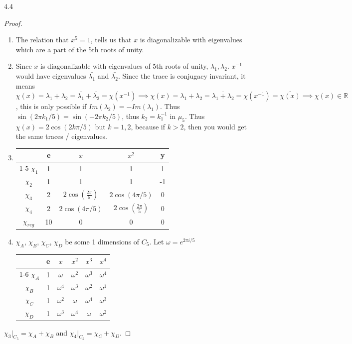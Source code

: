 \documentclass{article}
\newcommand{\R}{\mathbb{R}}
\begin{document}
\begin{PROB}{4.4}\label{Problem 4.4.}
    
\end{PROB}
\begin{proof}
    \begin{enumerate}
        \item The relation that $x^5 = 1$, tells us that $x$ is diagonalizable with eigenvalues which are a part of the 5th roots of unity. 
        \item Since $x$ is diagonalizable with eigenvalues of 5th roots of unity, $\lambda_1, \lambda_2$. $x^{-1}$ would have eigenvalues $\bar{\lambda_1}$ and $\bar{\lambda_2}$. Since the trace is conjugacy invariant, it means $\chi(x) = \lambda_1 + \lambda_2 = \bar{\lambda_1} +\bar{\lambda_2} = \chi(x^{-1}) \implies \chi(x) = \lambda_1 + \lambda_2 = \overline{\lambda_1 + \lambda_2} = \chi(x^{-1}) = \overline{\chi(x)} \implies \chi(x) \in \R$, this is only possible if $Im(\lambda_2) = - Im(\lambda_1)$. Thus $\sin(2 \pi k_1 / 5) = \sin( - 2 \pi k_2 / 5)$, thus $k_2 = k_1^{-1}$ in $\mu_5$. Thus $\chi(x) = 2\cos(2 k \pi /5)$ but $k = 1, 2$, because if $k > 2$, then you would get the same traces / eigenvalues.
        \item \begin{tabular}{c | c c c c }
            & e & $x$ & $x^2$ & y  \\
            \cline{1-5}
            $\chi_1$ & 1 & 1 & 1 & 1 \\
            $\chi_2$ & 1 & 1 & 1 & -1 \\
            $\chi_3$ & 2 & $2 \cos(\frac{2\pi}{5})$ & $2 \cos(4 \pi /5)$ & 0 \\
            $\chi_4$ & 2 & $2 \cos(4 \pi /5)$ & $2 \cos(\frac{2\pi}{5})$ & 0 \\
            $\chi_{reg}$ & 10 & 0 & 0 & 0
    
        \end{tabular} 

        \item $\chi_A$, $\chi_B$, $\chi_C$, $\chi_D$   be some 1 dimensions of $C_5$. Let $\omega = e^{2 \pi i / 5}$ 
        
        \begin{tabular}{c | c c c c c }
            & e & $x$ & $x^2$ & $x^3$ & $x^4$\\
            \cline{1-6}
            $\chi_A$ & 1 & $\omega$ & $\omega^2$ & $\omega^3$ & $\omega^4$ \\
            $\chi_B$ & 1 & $\omega^4$ & $\omega^3$ & $\omega^2$ & $\omega^1$ \\
            $\chi_C$ & 1 & $\omega^2$ & $\omega$ & $\omega^4$ & $\omega^3$ \\
            $\chi_D$ & 1 & $\omega^3$ & $\omega^4$ & $\omega$ & $\omega^2$ \\
        \end{tabular} 
    \end{enumerate}

    $\chi_3|_{C_5} = \chi_{A} + \chi_B$ and $\chi_4|_{C_5} = \chi_C + \chi_D$.   
\end{proof}
\end{document}
